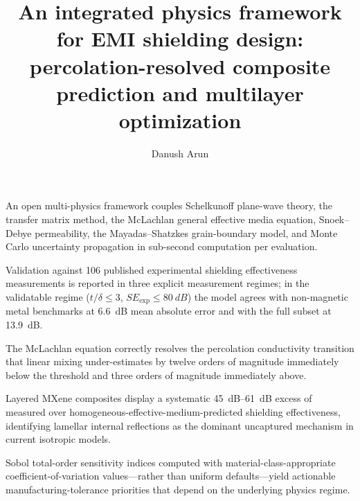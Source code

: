 \documentclass[review,3p,authoryear]{elsarticle}
\begin{document}
\begin{frontmatter}

\title{An integrated physics framework for EMI shielding design: percolation-resolved composite prediction and multilayer optimization}

\author[inst1]{Danush Arun}

\begin{highlights}
\item An open multi-physics framework couples Schelkunoff plane-wave theory, the transfer matrix method, the McLachlan general effective media equation, Snoek--Debye permeability, the Mayadas--Shatzkes grain-boundary model, and Monte Carlo uncertainty propagation in sub-second computation per evaluation.
\item Validation against 106 published experimental shielding effectiveness measurements is reported in three explicit measurement regimes; in the validatable regime ($t/\delta \leq 3$, $SE_{\mathrm{exp}} \leq \SI{80}{dB}$) the model agrees with non-magnetic metal benchmarks at \SI{6.6}{dB} mean absolute error and with the full subset at \SI{13.9}{dB}.
\item The McLachlan equation correctly resolves the percolation conductivity transition that linear mixing under-estimates by twelve orders of magnitude immediately below the threshold and three orders of magnitude immediately above.
\item Layered MXene composites display a systematic \SI{45}{dB}--\SI{61}{dB} excess of measured over homogeneous-effective-medium-predicted shielding effectiveness, identifying lamellar internal reflections as the dominant uncaptured mechanism in current isotropic models.
\item Sobol total-order sensitivity indices computed with material-class-appropriate coefficient-of-variation values---rather than uniform defaults---yield actionable manufacturing-tolerance priorities that depend on the underlying physics regime.
\end{highlights}


\end{frontmatter}
\end{document}
